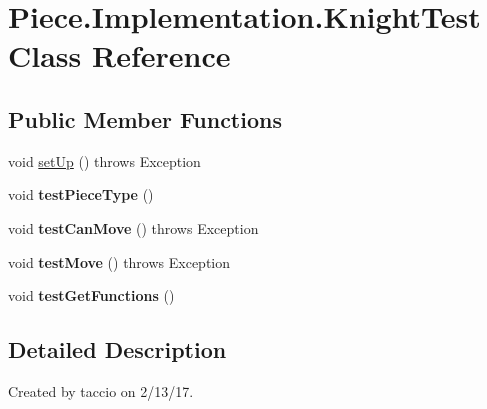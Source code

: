 \hypertarget{classPiece_1_1Implementation_1_1KnightTest}{\section{Piece.\-Implementation.\-Knight\-Test Class Reference}
\label{classPiece_1_1Implementation_1_1KnightTest}
}
\subsection*{Public Member Functions}
\begin{DoxyCompactItemize}
\item 
void \hyperlink{classPiece_1_1Implementation_1_1KnightTest_a08efc9f0f3fdd9e9a2d0f7d9b6707780}{set\-Up} ()  throws Exception 
\item 
\hypertarget{classPiece_1_1Implementation_1_1KnightTest_afddaa01647df0e6fbd19f2ca2510d248}{void {\bfseries test\-Piece\-Type} ()}\label{classPiece_1_1Implementation_1_1KnightTest_afddaa01647df0e6fbd19f2ca2510d248}

\item 
\hypertarget{classPiece_1_1Implementation_1_1KnightTest_a1765952fb19187d8851d505073ec6ef1}{void {\bfseries test\-Can\-Move} ()  throws Exception}\label{classPiece_1_1Implementation_1_1KnightTest_a1765952fb19187d8851d505073ec6ef1}

\item 
\hypertarget{classPiece_1_1Implementation_1_1KnightTest_a1416907f4eac35538b6e08a5df81fc38}{void {\bfseries test\-Move} ()  throws Exception}\label{classPiece_1_1Implementation_1_1KnightTest_a1416907f4eac35538b6e08a5df81fc38}

\item 
\hypertarget{classPiece_1_1Implementation_1_1KnightTest_ae893bc2aefe761c09bf7e6c369f472cd}{void {\bfseries test\-Get\-Functions} ()}\label{classPiece_1_1Implementation_1_1KnightTest_ae893bc2aefe761c09bf7e6c369f472cd}

\end{DoxyCompactItemize}


\subsection{Detailed Description}
Created by taccio on 2/13/17. 

